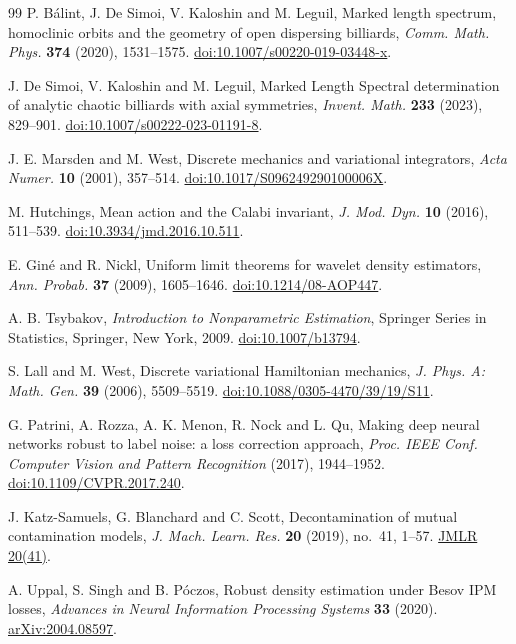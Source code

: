 \begin{thebibliography}{99}
P. B\'alint, J. De Simoi, V. Kaloshin and M. Leguil,
Marked length spectrum, homoclinic orbits and the geometry of open dispersing
billiards, \emph{Comm. Math. Phys.} \textbf{374} (2020), 1531--1575.
\href{https://doi.org/10.1007/s00220-019-03448-x}{doi:10.1007/s00220-019-03448-x}.

J. De Simoi, V. Kaloshin and M. Leguil,
Marked Length Spectral determination of analytic chaotic billiards with axial
symmetries, \emph{Invent. Math.} \textbf{233} (2023), 829--901.
\href{https://doi.org/10.1007/s00222-023-01191-8}{doi:10.1007/s00222-023-01191-8}.

J. E. Marsden and M. West,
Discrete mechanics and variational integrators,
\emph{Acta Numer.} \textbf{10} (2001), 357--514.
\href{https://doi.org/10.1017/S096249290100006X}{doi:10.1017/S096249290100006X}.

M. Hutchings, Mean action and the Calabi invariant,
\emph{J. Mod. Dyn.} \textbf{10} (2016), 511--539.
\href{https://doi.org/10.3934/jmd.2016.10.511}{doi:10.3934/jmd.2016.10.511}.

E. Gin\'e and R. Nickl,
Uniform limit theorems for wavelet density estimators,
\emph{Ann. Probab.} \textbf{37} (2009), 1605--1646.
\href{https://doi.org/10.1214/08-AOP447}{doi:10.1214/08-AOP447}.

A. B. Tsybakov, \emph{Introduction to Nonparametric Estimation},
Springer Series in Statistics, Springer, New York, 2009.
\href{https://doi.org/10.1007/b13794}{doi:10.1007/b13794}.

S. Lall and M. West,
Discrete variational Hamiltonian mechanics,
\emph{J. Phys. A: Math. Gen.} \textbf{39} (2006), 5509--5519.
\href{https://doi.org/10.1088/0305-4470/39/19/S11}{doi:10.1088/0305-4470/39/19/S11}.

G. Patrini, A. Rozza, A. K. Menon, R. Nock and L. Qu,
Making deep neural networks robust to label noise: a loss correction approach,
\emph{Proc. IEEE Conf. Computer Vision and Pattern Recognition} (2017), 1944--1952.
\href{https://doi.org/10.1109/CVPR.2017.240}{doi:10.1109/CVPR.2017.240}.

J. Katz-Samuels, G. Blanchard and C. Scott,
Decontamination of mutual contamination models,
\emph{J. Mach. Learn. Res.} \textbf{20} (2019), no.~41, 1--57.
\href{https://www.jmlr.org/papers/v20/17-576.html}{JMLR 20(41)}.

A. Uppal, S. Singh and B. P\'oczos,
Robust density estimation under Besov IPM losses,
\emph{Advances in Neural Information Processing Systems} \textbf{33} (2020).
\href{https://arxiv.org/abs/2004.08597}{arXiv:2004.08597}.
\end{thebibliography}
